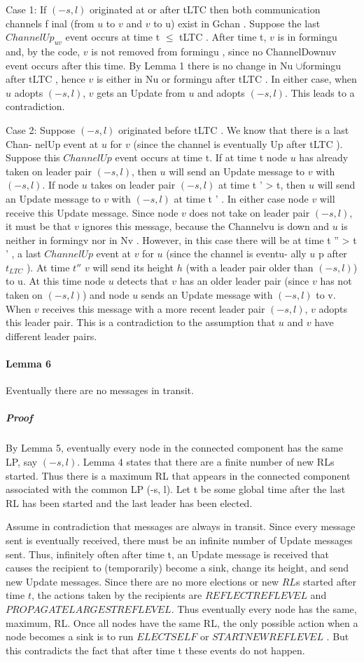 Case 1: If $(-s, l)$ originated at or after tLTC then both communication channels f inal (from $u$ to $v$ and $v$ to u) exist in Gchan . Suppose the last $ChannelUp_{uv}$ event occurs at time t $\leq$ tLTC . After time t, $v$ is in formingu and, by the code, $v$ is not removed from formingu , since no ChannelDownuv event occurs after this time. By Lemma 1 there is no change in Nu $\cup$formingu after tLTC , hence $v$ is either in Nu or formingu after tLTC . In either case, when $u$ adopts $(-s, l)$, $v$ gets an Update from $u$ and adopts $(-s, l)$. This leads to a contradiction.

Case 2: Suppose $(-s, l)$ originated before tLTC . We know that there is a last Chan- nelUp event at $u$ for $v$ (since the channel is eventually Up after tLTC ). Suppose this $ChannelUp$ event occurs at time t. If at time t node $u$ has already taken on leader pair $(-s, l)$, then $u$ will send an Update message to $v$ with $(-s, l)$. If node $u$ takes on leader pair $(-s, l)$ at time t ' > t, then $u$ will send an Update message to $v$ with $(-s, l)$ at time t ' . In either case node $v$ will receive this Update message. Since node $v$ does not take on leader pair $(-s, l)$, it must be that $v$ ignores this message, because the Channelvu is down and $u$ is neither in formingv nor in Nv . However, in this case there will be at time t '' > t ' , a last $ChannelUp$ event at $v$ for $u$ (since the channel is eventu- ally $u$ p after $t_{LTC}$ ). At time $t''$ $v$ will send its height $h$ (with a leader pair older than $(-s, l)$) to u. At this time node $u$ detects that $v$ has an older leader pair (since $v$ has not taken on $(-s, l)$) and node $u$ sends an Update message with $(-s, l)$ to v. When $v$ receives this message with a more recent leader pair $(-s, l)$, $v$ adopts this leader pair. This is a contradiction to the assumption that $u$ and $v$ have different leader pairs.
\paragraph{Lemma 6}Eventually there are no messages in transit.
\subparagraph{Proof}By Lemma 5, eventually every node in the connected component has the same LP, say $(-s, l)$. Lemma 4 states that there are a finite number of new RLs started. Thus there is a maximum RL that appears in the connected component associated with the common LP (-s, l). Let t be some global time after the last RL has been started and the last leader has been elected.

Assume in contradiction that messages are always in transit. Since every message sent is eventually received, there must be an infinite number of Update messages sent. Thus, infinitely often after time t, an Update message is received that causes the recipient to (temporarily) become a sink, change its height, and send new Update messages. Since there are no more elections or new $RL$s started after time $t$, the actions taken by the recipients are $REFLECTREFLEVEL$ and $PROPAGATELARGESTREFLEVEL$. Thus eventually every node has the same, maximum, RL. Once all nodes have the same RL, the only possible action when a node becomes a sink is to run $ELECTSELF$ or $STARTNEWREFLEVEL$ . But this contradicts the fact that after time t these events do not happen.

